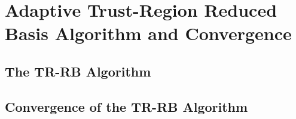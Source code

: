 \section{Adaptive Trust-Region Reduced Basis Algorithm and Convergence}

\subsection{The TR-RB Algorithm}


\subsection{Convergence of the TR-RB Algorithm}

